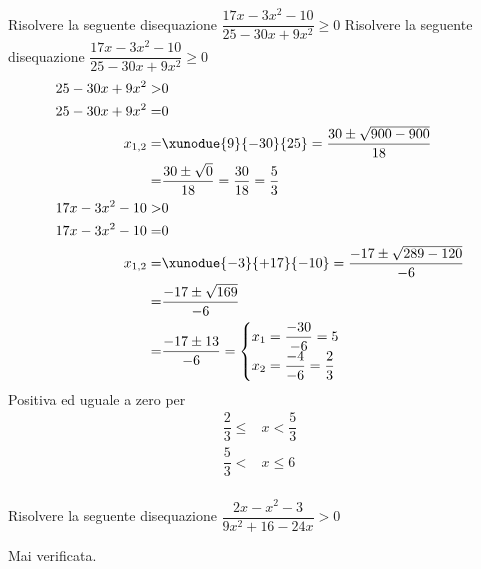 \begin{exercise}
		Risolvere la seguente disequazione $\dfrac{17x-3x^2-10}{25-30x+9x^2}\geq 0$
	\tcblower
	Risolvere la seguente disequazione $\dfrac{17x-3x^2-10}{25-30x+9x^2}\geq 0$
	\begin{align*}
25-30x+9x^2>&0\\
25-30x+9x^2=&0\\
x_{1,2}=&\xunodue{9}{-30}{25}=\dfrac{30\pm\sqrt{900-900}}{18}\\
=&\dfrac{30\pm\sqrt{0}}{18}=\dfrac{30}{18}=\dfrac{5}{3}\\
17x-3x^2-10>&0\\
17x-3x^2-10=&0\\
x_{1,2}=&\xunodue{-3}{+17}{-10}=\dfrac{-17\pm\sqrt{289-120}}{-6}\\
=&\dfrac{-17\pm\sqrt{169}}{-6}\\
=&\dfrac{-17\pm 13}{-6}=\begin{cases}
x_1=\dfrac{-30}{-6}=5\\
x_2=\dfrac{-4}{-6}=\dfrac{2}{3}
\end{cases}\\
	\end{align*}
Positiva ed uguale a zero per
	\begin{align*}
	\dfrac{2}{3}\leq&x<\dfrac{5}{3}\\
	\dfrac{5}{3}<&x\leq 6\\
	\end{align*}
\begin{center}
	
\end{center}
\end{exercise}
\begin{exercise}
		Risolvere la seguente disequazione $\dfrac{2x-x^2-3}{9x^2+16-24x}> 0$
	\tcblower
	
	Mai verificata.
\end{exercise}
